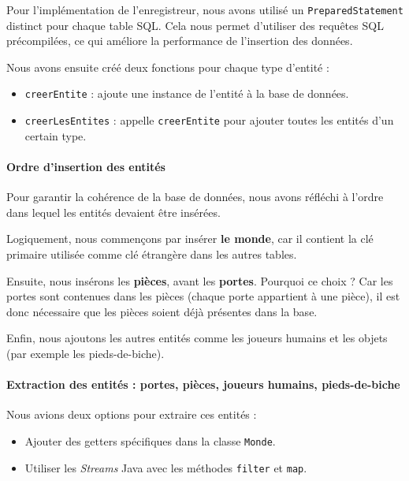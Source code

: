 Pour l’implémentation de l’enregistreur, nous avons utilisé un \texttt{PreparedStatement} distinct pour chaque table SQL. Cela nous permet d’utiliser des requêtes SQL précompilées, ce qui améliore la performance de l’insertion des données.

Nous avons ensuite créé deux fonctions pour chaque type d’entité :

\footnotesize
\begin{itemize}
  \item \texttt{creerEntite} : ajoute une instance de l’entité à la base de données.
  \item \texttt{creerLesEntites} : appelle \texttt{creerEntite} pour ajouter toutes les entités d’un certain type.
\end{itemize}
\normalsize

\paragraph{Ordre d’insertion des entités}

Pour garantir la cohérence de la base de données, nous avons réfléchi à l’ordre dans lequel les entités devaient être insérées.

Logiquement, nous commençons par insérer \textbf{le monde}, car il contient la clé primaire utilisée comme clé étrangère dans les autres tables.

Ensuite, nous insérons les \textbf{pièces}, avant les \textbf{portes}. Pourquoi ce choix ? Car les portes sont contenues dans les pièces (chaque porte appartient à une pièce), il est donc nécessaire que les pièces soient déjà présentes dans la base.

Enfin, nous ajoutons les autres entités comme les joueurs humains et les objets (par exemple les pieds-de-biche).

\paragraph{Extraction des entités : portes, pièces, joueurs humains, pieds-de-biche}

Nous avions deux options pour extraire ces entités :
\begin{itemize}
  \item Ajouter des getters spécifiques dans la classe \texttt{Monde}.
  \item Utiliser les \textit{Streams} Java avec les méthodes \texttt{filter} et \texttt{map}.
\end{itemize}

